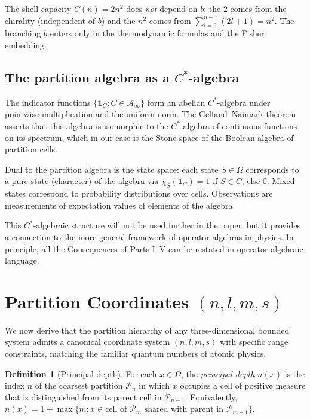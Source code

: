 \documentclass[11pt,twocolumn,a4paper]{article}
\theoremstyle{axiomstyle}
\theoremstyle{conseqstyle}
\theoremstyle{definition}
\newtheorem{definition}{Definition}
\theoremstyle{remark}
\newcommand{\Partition}{\mathcal{P}}
\begin{document}
The shell capacity $C(n)=2n^{2}$ does \emph{not} depend on $b$; the $2$ comes from the chirality (independent of $b$) and the $n^{2}$ comes from $\sum_{l=0}^{n-1}(2l+1)=n^{2}$. The branching $b$ enters only in the thermodynamic formulas and the Fisher embedding.

\subsection{The partition algebra as a $C^{*}$-algebra}

The indicator functions $\{\mathbf{1}_{C}\colon C\in\mathcal{A}_{\infty}\}$ form an abelian $C^{*}$-algebra under pointwise multiplication and the uniform norm. The Gelfand--Naimark theorem asserts that this algebra is isomorphic to the $C^{*}$-algebra of continuous functions on its spectrum, which in our case is the Stone space of the Boolean algebra of partition cells.

Dual to the partition algebra is the state space: each state $S\in\Omega$ corresponds to a pure state (character) of the algebra via $\chi_{S}(\mathbf{1}_{C})=1$ if $S\in C$, else $0$. Mixed states correspond to probability distributions over cells. Observations are measurements of expectation values of elements of the algebra.

This $C^{*}$-algebraic structure will not be used further in the paper, but it provides a connection to the more general framework of operator algebras in physics. In principle, all the Consequences of Parts I--V can be restated in operator-algebraic language.

\section{Partition Coordinates $(n,l,m,s)$}
\label{sec:quantumnumbers}

We now derive that the partition hierarchy of any three-dimensional bounded system admits a canonical coordinate system $(n,l,m,s)$ with specific range constraints, matching the familiar quantum numbers of atomic physics.

\begin{definition}[Principal depth]
\label{def:principal}
For each $x\in\Omega$, the \emph{principal depth} $n(x)$ is the index $n$ of the coarsest partition $\Partition_{n}$ in which $x$ occupies a cell of positive measure that is distinguished from its parent cell in $\Partition_{n-1}$. Equivalently, $n(x)=1+\max\{m: x\in\text{cell of }\Partition_{m}\text{ shared with parent in }\Partition_{m-1}\}$.
\end{definition}
\end{document}
